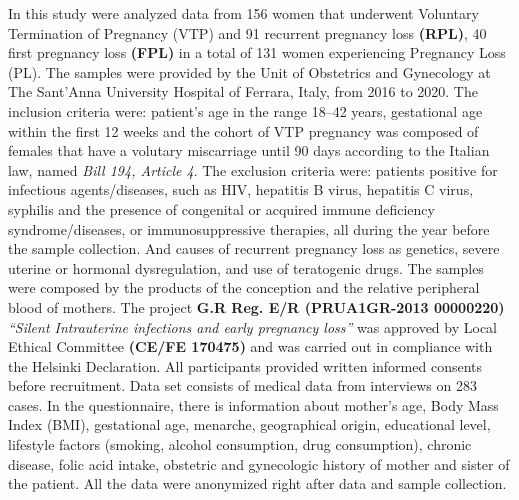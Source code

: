 \documentclass[journal,article,submit,moreauthors,pdftex]{Definitions/mdpi}
\begin{document}
\noindent In this study were analyzed data from 156 women that underwent Voluntary Termination of Pregnancy (VTP) and 91 recurrent pregnancy loss \textbf{(RPL)}, 40 first pregnancy loss \textbf{(FPL)} in a total of 131 women experiencing Pregnancy Loss (PL). The samples were provided by the Unit of Obstetrics and Gynecology at The Sant’Anna University Hospital of Ferrara, Italy, from 2016 to 2020. The inclusion criteria were: patient’s age in the range 18–42 years, gestational age within the first 12 weeks and the cohort of VTP pregnancy was composed of females that have a volutary miscarriage until 90 days according to the Italian law, named \textit{Bill 194, Article 4}. The exclusion criteria were: patients positive for infectious agents/diseases, such as HIV, hepatitis B virus, hepatitis C virus, syphilis and the presence of congenital or acquired immune deficiency syndrome/diseases, or immunosuppressive therapies, all during the year before the sample collection. And causes of recurrent pregnancy loss as genetics, severe uterine or hormonal dysregulation, and use of teratogenic drugs. The samples were composed by the products of the conception and the relative peripheral blood of mothers. The project \textbf{G.R Reg. E/R (PRUA1GR-2013 00000220)} \textit{“Silent Intrauterine infections and early pregnancy loss”} was approved by Local Ethical Committee \textbf{(CE/FE 170475)} and was carried out in compliance with the Helsinki Declaration. All participants provided written informed consents before recruitment. Data set consists of medical data from interviews on 283 cases. In the questionnaire, there is information about mother’s age, Body Mass Index (BMI), gestational age, menarche, geographical origin, educational level, lifestyle factors (smoking, alcohol consumption, drug consumption), chronic disease, folic acid intake, obstetric and gynecologic history of mother and sister of the patient. All the data were anonymized right after data and sample collection. 
\end{document}
